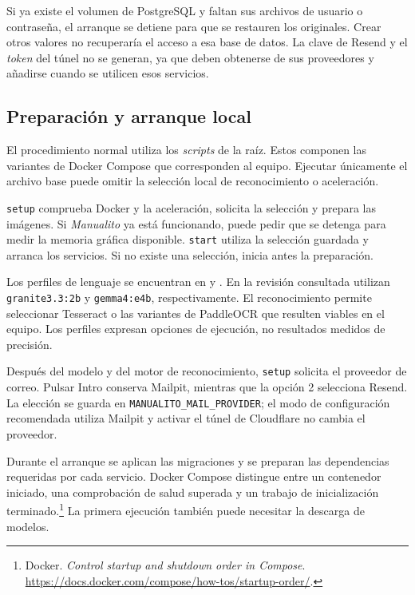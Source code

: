 Si ya existe el volumen de PostgreSQL y faltan sus archivos de usuario o
contraseña, el arranque se detiene para que se restauren los originales.
Crear otros valores no recuperaría el acceso a esa base de datos. La clave
de Resend y el \textit{token} del túnel no se generan, ya que deben obtenerse
de sus proveedores y añadirse cuando se utilicen esos servicios.

\subsection{Preparación y arranque local}

El procedimiento normal utiliza los \textit{scripts} de la raíz. Estos componen las variantes de Docker Compose que corresponden al equipo. Ejecutar únicamente el archivo base puede omitir la selección local de reconocimiento o aceleración.



\texttt{setup} comprueba Docker y la aceleración, solicita la selección y prepara las imágenes. Si \textit{Manualito} ya está funcionando, puede pedir que se detenga para medir la memoria gráfica disponible. \texttt{start} utiliza la selección guardada y arranca los servicios. Si no existe una selección, inicia antes la preparación.

Los perfiles de lenguaje se encuentran en  y . En la revisión consultada utilizan \texttt{granite3.3:2b} y \texttt{gemma4:e4b}, respectivamente. El reconocimiento permite seleccionar Tesseract o las variantes de PaddleOCR que resulten viables en el equipo. Los perfiles expresan opciones de ejecución, no resultados medidos de precisión.

Después del modelo y del motor de reconocimiento, \texttt{setup} solicita
el proveedor de correo. Pulsar Intro conserva Mailpit, mientras que la
opción 2 selecciona Resend. La elección se guarda en
\texttt{MANUALITO\_MAIL\_PROVIDER}; el modo de configuración recomendada
utiliza Mailpit y activar el túnel de Cloudflare no cambia el proveedor.

Durante el arranque se aplican las migraciones y se preparan las dependencias requeridas por cada servicio. Docker Compose distingue entre un contenedor iniciado, una comprobación de salud superada y un trabajo de inicialización terminado.\footnote{Docker. \emph{Control startup and shutdown order in Compose}. \url{https://docs.docker.com/compose/how-tos/startup-order/}.} La primera ejecución también puede necesitar la descarga de modelos.

